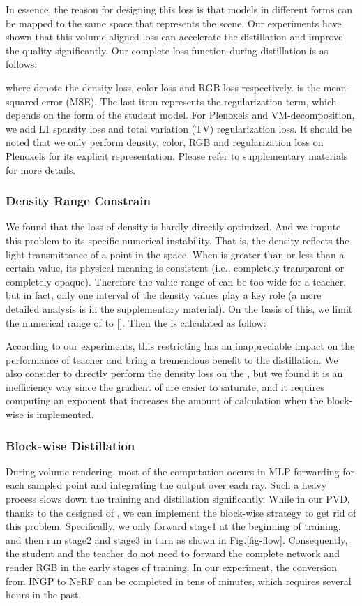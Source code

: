 \documentclass[letterpaper]{article} \usepackage{aaai23}  \usepackage{times}  \usepackage{helvet}  \usepackage{courier}  \usepackage[hyphens]{url}  \usepackage{graphicx} \urlstyle{rm} \def\UrlFont{\rm}  \usepackage{natbib}  \usepackage{caption} \frenchspacing  \setlength{\pdfpagewidth}{8.5in}  \setlength{\pdfpageheight}{11in}  \usepackage{multirow}
\begin{document}
In essence, the reason for designing this loss is that models in different forms can be mapped to the same space that represents the scene. Our experiments have shown that this volume-aligned loss can accelerate the distillation and improve the quality significantly. Our complete loss function during distillation is as follows:

where  denote the density loss, color loss and RGB loss respectively.  is the mean-squared error (MSE). The last item  represents the regularization term, which depends on the form of the student model. For Plenoxels and VM-decomposition, we add L1 sparsity loss and total variation (TV) regularization loss.
It should be noted that we only perform density, color, RGB and regularization loss on Plenoxels for its explicit representation. Please refer to supplementary materials for more details.


\subsubsection{Density Range Constrain}
We found that the loss of density  is hardly directly optimized. And we impute this problem to its specific numerical instability. That is, the density reflects the light transmittance of a point in the space. When  is greater than or less than a certain value, its physical meaning is consistent (i.e., completely transparent or completely opaque). Therefore the value range of  can be too wide for a teacher, but in fact, only one interval of the density values play a key role (a more detailed analysis is in the supplementary material). On the basis of this, we limit the numerical range of  to []. Then the  is calculated as follow:

According to our experiments, this restricting has an inappreciable impact on the performance of teacher and bring a tremendous benefit to the distillation. We also consider to directly perform the density loss on the , but we found it is an inefficiency way since the gradient of  are easier to saturate, and it requires computing an exponent that increases the amount of calculation when the block-wise is implemented.






\subsubsection{Block-wise Distillation}
During volume rendering, most of the computation occurs in MLP forwarding for each sampled point and integrating the output over each ray. Such a heavy process slows down the training and distillation significantly.
While in our PVD, thanks to the designed of , we can implement the block-wise strategy to get rid of this problem. Specifically, we only forward stage1 at the beginning of training, and then run stage2 and stage3 in turn as shown in Fig.\ref{fig-flow}. Consequently, the student and the teacher do not need to forward the complete network and render RGB in the early stages of training. In our experiment, the conversion from INGP to NeRF can be completed in tens of minutes, which requires several hours in the past.
\end{document}
